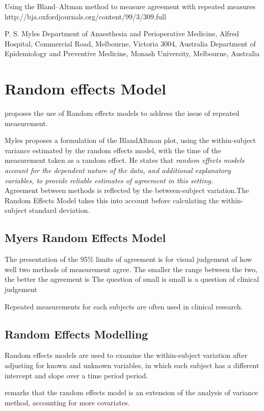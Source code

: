 \documentclass[MAIN.tex]{subfiles}
\begin{document}
	
	
Using the Bland–Altman method to measure agreement with repeated measures
http://bja.oxfordjournals.org/content/99/3/309.full

P. S. Myles
Department of Anaesthesia and Perioperative Medicine, Alfred Hospital, Commercial Road, Melbourne, Victoria 3004, Australia
Department of Epidemiology and Preventive Medicine, Monash University, Melbourne, Australia

\section{Random effects Model} 

\citet{Myles} proposes the use of
Random effects models to address the issue of repeated
measurement. 

Myles proposes a formulation of the BlandAltman
plot, using the within-subject variance estimated by the random
effects model, with the time of the measurement taken as a random
effect. He states that \emph{random effects models account for the
	dependent nature of the data, and additional explanatory
	variables, to provide reliable estimates of agreement in this
	setting.}
\\
Agreement between methods is reflected by the between-subject
variation.The Random Effects Model takes this into account before
calculating the within-subject standard deviation.

\subsection{Myers Random Effects Model} The presentation of the
95\% limits of agreement is for visual judgement of how well two
methods of measurement agree. The smaller the range between the
two, the better the agreement is The question of small is small is
a question of clinical judgement


Repeated measurements for each subjects are often used in clinical
research.



\subsection{Random Effects Modelling}
Random effects models are used to examine the within-subject
variation after adjusting for known and unknown variables, in
which each subject has a different intercept and slope over a time
period period.


\citet{Myles} remarks that the random effects model is an
extension of the analysis of variance method, accounting for more
covariates.
\end{document}
